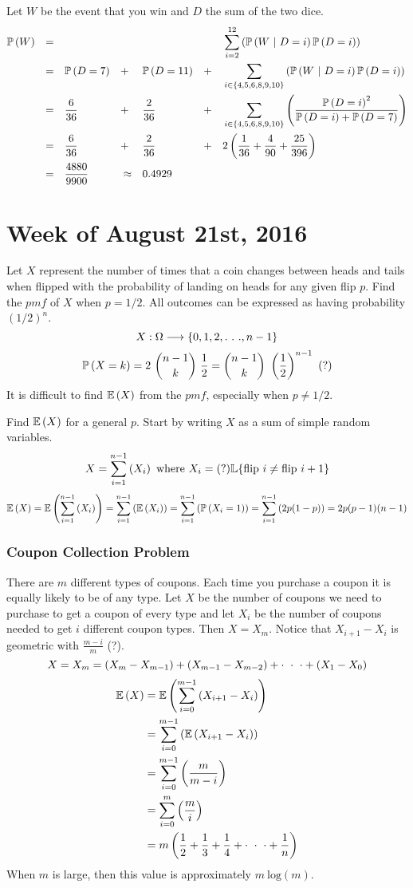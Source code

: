 \documentclass{article}
\begin{document}
\noindent Let $W$ be the event that you win and $D$ the sum of the two dice.
\begin{align*}
\mathbb{P}\left(W\right) 	&&= &&&&&&&&&&&\sum_{i=2}^{12} \left(\mathbb{P}\left(W\ |\  D=i\right)\mathbb{P}\left(D=i\right)\right) \\
			&&= &&&\mathbb{P}\left(D=7\right) &&+ &&\mathbb{P}\left(D=11\right) &&+ &&\sum_{i \in \{4,5,6,8,9,10\}} \left(\mathbb{P}\left(W\ |\  D=i\right)\mathbb{P}\left(D=i\right)\right) \\
			&&= &&&\frac{6}{36} &&+ &&\frac{2}{36} &&+ &&\sum_{i \in \{4,5,6,8,9,10\}} \left(\frac{\mathbb{P}\left(D=i\right)^2}{\mathbb{P}\left(D=i\right)+\mathbb{P}\left(D=7\right)}\right) \\
			&&= &&&\frac{6}{36} &&+ &&\frac{2}{36} &&+ &&2\left(\frac{1}{36} + \frac{4}{90} + \frac{25}{396}\right) \\
			&&= &&&\frac{4880}{9900} &&\approx &&0.4929
\end{align*}

\section{Week of August 21st, 2016}
Let $X$ represent the number of times that a coin changes between heads and tails when flipped with the probability of landing on heads for any given flip $p$. Find the $pmf$ of $X$ when $p=1/2$. All outcomes can be expressed as having probability $(1/2)^n$.
$$X: \Omega\longrightarrow\{0,1,2,.\ .\ .,n-1\}$$
$$\prob{X=k}=2\ \binom{n-1}{k}\ \frac{1}{2}=\binom{n-1}{k}\ \left(\frac{1}{2}\right)^{n-1}\ (?)$$
It is difficult to find $\mathbb{E}\left(X\right)$ from the $pmf$, especially when $p\neq1/2$.

\begin{example}[2.4.1]
Find $\mathbb{E}\left(X\right)$ for a general $p$. Start by writing $X$ as a sum of simple random variables.
$$X=\sum_{i=1}^{n-1}\left(X_i\right)\text{ where } X_i=(?)\mathbb{L}\{\text{flip } i\neq\text{flip } i+1\}$$
$$\mathbb{E}\left(X\right) = \mathbb{E}\left(\sum_{i=1}^{n-1}\left(X_i\right)\right) =\sum_{i=1}^{n-1}\left(\mathbb{E}\left(X_i\right)\right) = \sum_{i=1}^{n-1}\left(\mathbb{P}\left(X_i=1\right)\right) = \sum_{i=1}^{n-1}\left(2p(1-p)\right) = 2p(p-1)(n-1)$$
\end{example}

\subsubsection{Coupon Collection Problem}
There are $m$ different types of coupons. Each time you purchase a coupon it is equally likely to be of any type. Let $X$ be the number of coupons we need to purchase to get a coupon of every type and let $X_i$ be the number of coupons needed to get $i$ different coupon types. Then $X=X_m$. Notice that $X_{i+1}-X_i$ is geometric with $\frac{m-i}{m}$ (?).
$$X=X_m=(X_m-X_{m-1})+(X_{m-1}-X_{m-2})+\cdot\ \cdot\ \cdot+(X_1-X_0)$$
\begin{align*}
\mathbb{E}\left(X\right)&=\mathbb{E}\left(\sum_{i=0}^{m-1}\left(X_{i+1}-X_i\right)\right) \\
		  &=\sum_{i=0}^{m-1}\left(\mathbb{E}\left(X_{i+1}-X_i\right)\right) \\
		  &=\sum_{i=0}^{m-1}\left(\frac{m}{m-i}\right) \\
		  &=\sum_{i=0}^{m}\left(\frac{m}{i}\right) \\
		  &=m\left(\frac{1}{2}+\frac{1}{3}+\frac{1}{4}+\cdot\ \cdot\ \cdot+\frac{1}{n}\right)
\end{align*}
When $m$ is large, then this value is approximately $m\ \text{log}(m)$.
\end{document}
